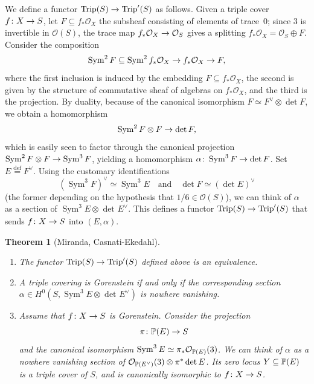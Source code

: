 \documentclass{amsart}
\numberwithin{equation}{section}
\numberwithin{subsection}{section}
\newenvironment{enumeratea}
{\begin{enumerate}[\upshape (a)]}
{\end{enumerate}}
\newtheorem{theorem}{Theorem}[section]
\theoremstyle{definition}
\theoremstyle{remark}
\newcommand\nome{testing}
\newcommand\call[1]{\label{#1}\renewcommand\nome{#1}}
\newcommand\itemref[1]{\item\label{\nome;#1}}
\newcommand\cO{\mathcal{O}} \newcommand\cP{\mathcal{P}}
\newcommand\arr{\ifinner\to\else\longrightarrow\fi}
\newcommand\eqdef{\overset{\mathrm{\scriptscriptstyle def}} =}
\newcommand{\trip}{\operatorname{Trip}}
\newcommand{\sym}{\operatorname{Sym}}
\newcommand{\symthree}[2][]{\sym^{3}_{{#1}}{#2} \otimes_{{#1}} \det\nolimits_{{#1}} {#2}\dual}
\newcommand{\dual}{^{\vee}}
\begin{document}
We define a functor $\trip(S) \arr \trip'(S)$ as follows. Given a triple cover $f \colon X \arr S$, let $F \subseteq f_{*}\cO_{X}$ the subsheaf consisting of elements of trace~$0$; since $3$ is invertible in $\cO(S)$, the trace map $f_{*}\cO_{X} \arr \cO_{S}$ gives a splitting $f_{*}\cO_{X} = \cO_{S} \oplus F$. Consider the composition
   \[
   \sym^{2} F \subseteq \sym^{2}f_{*}\cO_{X} \arr f_{*}\cO_{X} \arr F,
   \]
where the first inclusion is induced by the embedding $F \subseteq f_{*}\cO_{X}$, the second is given by the structure of commutative sheaf of algebras on $f_{*}\cO_{X}$, and the third is the projection. By duality, because of the canonical isomorphism $F \simeq F\dual \otimes \det F$, we obtain a homomorphism
   \[
   \sym^{2} F \otimes F \arr \det F,
   \]
which is easily seen to factor through the canonical projection $\sym^{2} F \otimes F \arr \sym^{3} F$, yielding a homomorphism $\alpha\colon \sym^{3} F \arr \det F$. Set $E \eqdef F\dual$. Using the customary identifications
   \[
   (\sym^3{F})\dual \simeq \sym^{3}E
   \quad\text{and}\quad
   \det F \simeq (\det E)\dual
   \]
(the former depending on the hypothesis that $1/6 \in \cO(S)$), we can think of $\alpha$ as a section of $\symthree{E}$. This defines a functor $\trip(S) \arr \trip'(S)$ that sends $f\colon X \arr S$ into $(E, \alpha)$.

\begin{theorem}[Miranda, Casnati-Ekedahl]\call{thm:describe-triple}\label{casna}\hfil
\begin{enumeratea}

\itemref{1} The functor $\trip(S) \arr \trip'(S)$ defined above is an equivalence.

\itemref{2} A triple covering is Gorenstein if and only if the corresponding section $\alpha \in H^0(S, \symthree{E})$ is nowhere vanishing.

\itemref{3} Assume that $f\colon X \arr S$ is Gorenstein. Consider the projection    
   \[
   \pi\colon \PP(E) \arr S
   \]
and the canonical isomorphism $\sym^{3}E \simeq \pi_{*}\cO_{\PP(E)}(3)$. We can think of $\alpha$ as a nowhere vanishing section of $\cO_{\PP(E\dual)}(3)\otimes \pi^{*}\det E$. Its zero locus $Y \subseteq \mathbb{P}(E)$ is a triple cover of $S$, and is canonically isomorphic to $f\colon X \arr S$.

\end{enumeratea}
\end{theorem}
\end{document}

